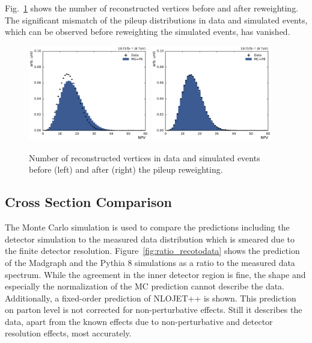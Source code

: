 Fig.~\ref{fig:mc:npv_reweighting} shows the number of reconstructed vertices
before and after reweighting. The significant mismatch of the
pileup distributions in data and simulated events, which can be observed before
reweighting the simulated events, has vanished.

\begin{figure}[htbp]
    \centering
    \includegraphics[width=0.47\textwidth]{figures/measurement/npv_beforereweighting.pdf}\hfill
    \includegraphics[width=0.47\textwidth]{figures/measurement/npv_afterreweighting.pdf}
    \caption[Number of reconstructed vertices]{Number of reconstructed vertices in data and simulated events before
    (left) and after (right) the pileup reweighting.}
    \label{fig:mc:npv_reweighting}
\end{figure}

\subsection{Cross Section Comparison}

The Monte Carlo simulation is used to compare the predictions including the
detector simulation to the measured data distribution which is smeared due to
the finite detector resolution. Figure~\ref{fig:ratio_recotodata} shows the
prediction of the Madgraph and the Pythia 8 simulations as a ratio to the
measured data spectrum. While the agreement in the inner detector region is
fine, the shape and especially the normalization of the MC prediction cannot
describe the data. Additionally, a fixed-order prediction of NLOJET++ is shown.
This prediction on parton level is not corrected for non-perturbative
effects. Still it describes the data, apart from the known effects due to
non-perturbative and detector resolution effects, most accurately.

